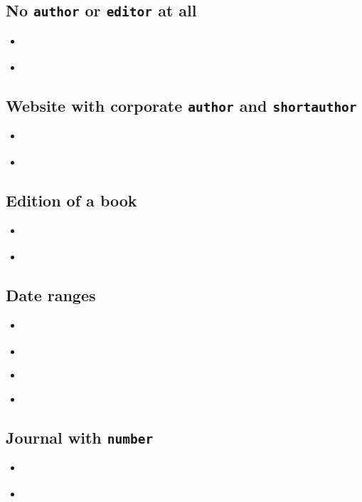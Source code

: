 \documentclass[a4paper,12pt]{scrartcl}
\newcommand*{\Feld}[1]{\texttt{#1}}
\begin{document}
\subsection{No \Feld{author} or \Feld{editor} at all}
\begin{itemize}
    \item\cite{domino:1780}%
    \item{}%
\end{itemize}

\subsection{Website with corporate \Feld{author} and \Feld{shortauthor}}
\begin{itemize}
    \item\cite{kenmore}%
    \item{}%
\end{itemize}

\subsection{Edition of a book}
\begin{itemize}
    \item\cite{fuchs:kh:et:al:1998}%
    \item{}%
\end{itemize}

\subsection{Date ranges}
\begin{itemize}
    \item\cite{bhattacharyya:1973}%
    \item{}%
    \item\cite{cossel:1933-35}%
    \item{}%
\end{itemize}

\subsection{Journal with \Feld{number}}
\begin{itemize}
    \item\cite{ib:domino:europa}%
    \item{}%
\end{itemize}
\end{document}
